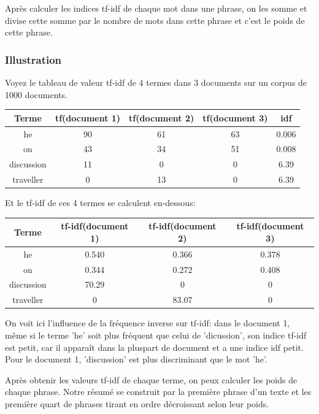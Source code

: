 \documentclass[a4paper, 12pt]{article}
\begin{document}
\begin{definition}
Après calculer les indices tf-idf de chaque mot dans une phrase, on les somme et divise cette somme par le nombre de mots dans cette phrase et c'est le poids de cette phrase.
\end{definition}

\subsubsection{Illustration}
Voyez le tableau de valeur tf-idf de 4 termes dans 3 documents sur un corpus de 1000 documents.
\begin{center}
	\begin{tabular}{|c|c|c|c|c|}
	 \hline
	 	Terme & tf(document 1) & tf(document 2) & tf(document 3) & idf \\
	 \hline
	 	he & 90 & 61 & 63 & 0.006 \\
	 \hline
	 	on & 43 & 34 & 51 & 0.008 \\
	 \hline
	 	discussion & 11 & 0 & 0 & 6.39 \\
	 \hline
	 	traveller & 0 & 13 & 0 & 6.39 \\
	 \hline
	\end{tabular}
\end{center}

Et le tf-idf de ces 4 termes se calculent en-dessous:

\begin{center}
	\begin{tabular}{|c|c|c|c|}
	 \hline
	 	Terme & tf-idf(document 1) & tf-idf(document 2) & tf-idf(document 3) \\
	 \hline
	 	he & 0.540 & 0.366 & 0.378 \\
	 \hline
	 	on & 0.344 & 0.272 & 0.408 \\
	 \hline
	 	discussion & 70.29 & 0 & 0 \\
	 \hline
	 	traveller & 0 & 83.07 & 0 \\
	 \hline
	\end{tabular}
\end{center}

On voit ici l'influence de la fréquence inverse sur tf-idf: dans le document 1, même si le terme 'he' soit plus fréquent que celui de 'dicussion', son indice tf-idf est petit, car il apparaît dans la pluspart de document et a une indice idf petit. Pour le document 1, 'discussion' est plus discriminant que le mot 'he'.

Après obtenir les valeurs tf-idf de chaque terme, on peux calculer les poids de chaque phrase. Notre résumé se construit par la première phrase d'un texte et les première quart de phrases tirant en ordre décroissant selon leur poids.
\end{document}
